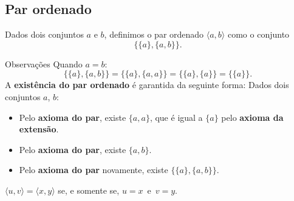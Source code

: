 \subsection{Par ordenado} 
\begin{definition}
  Dados dois conjuntos $a$ e $b$, definimos o par ordenado $\langle a ,b\rangle$ como o conjunto 
  $$\{\{a\},\{a, b\}\}.$$
\end{definition}
\begin{mymdframed}{Observações}
  Quando $a = b$:
  $$\{\{a\},\{a, b\}\} = \{\{a\},\{a, a\}\} = \{\{a\},\{a\}\} = \{\{a\}\}.$$
    A \textbf{existência do par ordenado} é garantida da seguinte forma:
    Dados dois conjuntos $a$, $b$: 
      \begin{itemize}      
          \item Pelo \textbf{axioma do par}, existe $\{a, a\}$, que é igual a $\{a\}$ pelo \textbf{axioma da extensão}.
          \item Pelo \textbf{axioma do par}, existe $\{a, b\}.$
          \item Pelo \textbf{axioma do par} novamente, existe $\{\{a\},\{a, b\}\}.$      
      \end{itemize}
\end{mymdframed}
\newpage
\begin{theorem}
  $\langle u ,v\rangle = \langle x ,y\rangle$ se, e somente se, $u = x$\ e\ $v = y$.
\end{theorem}
